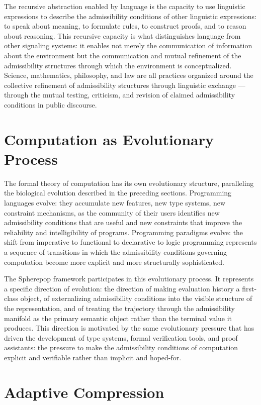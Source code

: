 \documentclass[12pt,openany]{book}
\theoremstyle{plain}
\theoremstyle{definition}
\theoremstyle{remark}
\begin{document}
The recursive abstraction enabled by language is the capacity to use linguistic expressions to describe the admissibility conditions of other linguistic expressions: to speak about meaning, to formulate rules, to construct proofs, and to reason about reasoning. This recursive capacity is what distinguishes language from other signaling systems: it enables not merely the communication of information about the environment but the communication and mutual refinement of the admissibility structures through which the environment is conceptualized. Science, mathematics, philosophy, and law are all practices organized around the collective refinement of admissibility structures through linguistic exchange — through the mutual testing, criticism, and revision of claimed admissibility conditions in public discourse.

\section{Computation as Evolutionary Process}

The formal theory of computation has its own evolutionary structure, paralleling the biological evolution described in the preceding sections. Programming languages evolve: they accumulate new features, new type systems, new constraint mechanisms, as the community of their users identifies new admissibility conditions that are useful and new constraints that improve the reliability and intelligibility of programs. Programming paradigms evolve: the shift from imperative to functional to declarative to logic programming represents a sequence of transitions in which the admissibility conditions governing computation become more explicit and more structurally sophisticated.

The Spherepop framework participates in this evolutionary process. It represents a specific direction of evolution: the direction of making evaluation history a first-class object, of externalizing admissibility conditions into the visible structure of the representation, and of treating the trajectory through the admissibility manifold as the primary semantic object rather than the terminal value it produces. This direction is motivated by the same evolutionary pressure that has driven the development of type systems, formal verification tools, and proof assistants: the pressure to make the admissibility conditions of computation explicit and verifiable rather than implicit and hoped-for.

\section{Adaptive Compression}
\end{document}
